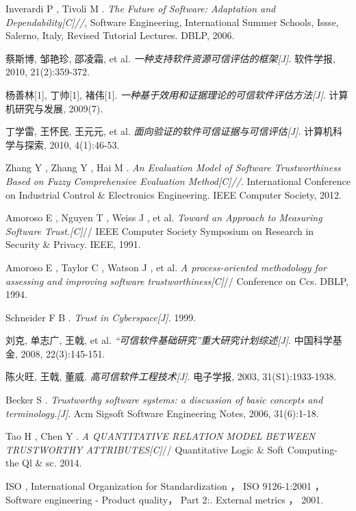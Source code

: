 
\begin{thebibliography}{2}
\setlength{\baselineskip}{25pt}

Inverardi P , Tivoli M . \emph{The Future of Software: Adaptation and Dependability[C]//}, Software Engineering, International Summer Schools, Issse, Salerno, Italy, Revised Tutorial Lectures. DBLP, 2006.

蔡斯博, 邹艳珍, 邵凌霜, et al. \emph{一种支持软件资源可信评估的框架[J]}. 软件学报, 2010, 21(2):359-372.

杨善林[1], 丁帅[1], 褚伟[1]. \emph{一种基于效用和证据理论的可信软件评估方法[J]}. 计算机研究与发展, 2009(7).

丁学雷, 王怀民, 王元元, et al. \emph{面向验证的软件可信证据与可信评估[J]}. 计算机科学与探索, 2010, 4(1):46-53.

Zhang Y , Zhang Y , Hai M . \emph{An Evaluation Model of Software Trustworthiness Based on Fuzzy Comprehensive Evaluation Method[C]//}. International Conference on Industrial Control \& Electronics Engineering. IEEE Computer Society, 2012.

Amoroso E , Nguyen T , Weiss J , et al. \emph{Toward an Approach to Measuring Software Trust.[C]}// IEEE Computer Society Symposium on Research in Security \& Privacy. IEEE, 1991.

Amoroso E , Taylor C , Watson J , et al. \emph{A process-oriented methodology for assessing and improving software trustworthiness[C]}// Conference on Ccs. DBLP, 1994.


Schneider F B . \emph{Trust in Cyberspace[J]}. 1999.

刘克, 单志广, 王戟, et al. \emph{“可信软件基础研究”重大研究计划综述[J]}. 中国科学基金, 2008, 22(3):145-151.


陈火旺, 王戟, 董威. \emph{高可信软件工程技术[J]}. 电子学报, 2003, 31(S1):1933-1938.

Becker S . \emph{Trustworthy software systems: a discussion of basic concepts and terminology.[J]}. Acm Sigsoft Software Engineering Notes, 2006, 31(6):1-18.

Tao H , Chen Y . \emph{A QUANTITATIVE RELATION MODEL BETWEEN TRUSTWORTHY ATTRIBUTES[C]}// Quantitative Logic \& Soft Computing-the Ql \& sc. 2014.


ISO , International Organization for Standardization ， ISO 9126-1:2001 ， Software engineering - Product quality， Part 2:. External metrics ， 2001.


\end{thebibliography}
